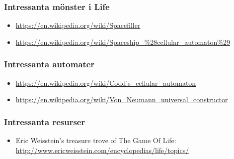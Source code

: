 \subsubsection{Intressanta mönster i Life}

\begin{itemize}[noitemsep,topsep=0pt]
    \item \url{https://en.wikipedia.org/wiki/Spacefiller}
    \item \url{https://en.wikipedia.org/wiki/Spaceship_\%28cellular_automaton\%29}
\end{itemize}

\subsubsection{Intressanta automater}

\begin{itemize}[noitemsep,topsep=0pt]
	\item \url{https://en.wikipedia.org/wiki/Codd's_cellular_automaton}
	\item \url{https://en.wikipedia.org/wiki/Von_Neumann_universal_constructor}
\end{itemize}

\subsubsection{Intressanta resurser}

\begin{itemize}[noitemsep,topsep=0pt]
    \item Eric Weisstein's treasure trove of The Game Of Life: \url{http://www.ericweisstein.com/encyclopedias/life/topics/}
\end{itemize}










